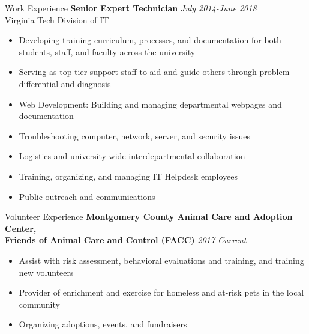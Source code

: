 \documentclass{resume} %
\begin{document}
\begin{rSection}{Work Experience}
  \textbf{Senior Expert Technician} \hfill \textit{July 2014-June 2018} \\
  Virginia Tech Division of IT
   \begin{itemize}
      \itemsep -3pt {} 
      \item Developing training curriculum, processes, and documentation for both students, staff, and faculty across the university
       \item Serving as top-tier support staff to aid and guide others through problem differential and diagnosis
       \item Web Development: Building and managing departmental webpages and documentation
       \item Troubleshooting computer, network, server, and security issues
       \item Logistics and university-wide interdepartmental collaboration
       \item Training, organizing, and managing IT Helpdesk employees
       \item Public outreach and communications
   \end{itemize}

\end{rSection} 

\begin{rSection}{Volunteer Experience} 
    \textbf{Montgomery County Animal Care and Adoption Center, \\ Friends of Animal Care and Control (FACC)} \hfill \textit{2017-Current}
\begin{itemize}
    \item Assist with risk assessment, behavioral evaluations and training, and training new volunteers
    \item Provider of enrichment and exercise for homeless and at-risk pets in the local community
    \item Organizing adoptions, events, and fundraisers
\end{itemize}

\end{rSection}
\end{document}
